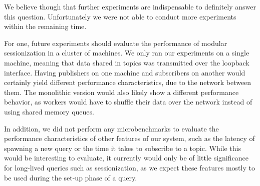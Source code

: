 We believe though that further experiments are indispensable to definitely 
answer this question. Unfortunately we were not able to conduct more experiments
within the remaining time.

For one, future experiments should evaluate the performance of modular sessionization
in a cluster of machines. We only ran our experiments on a single machine, meaning that
data shared in topics was transmitted over the loopback interface.
Having publishers on one machine and subscribers on another would certainly yield
different performance characteristics, due to the network between them.
The monolithic version would also likely show a different performance behavior,
as workers would have to shuffle their data over the
network instead of using shared memory queues.

In addition, we did not perform any microbenchmarks to evaluate the performance
characteristics of other features of our system, such as the latency
of spawning a new query or the time it takes to subscribe to a topic. While
this would be interesting to evaluate, it currently would only be of little
significance for long-lived queries such as sessionization, as we expect
these features mostly to be used during the set-up phase of a query.
